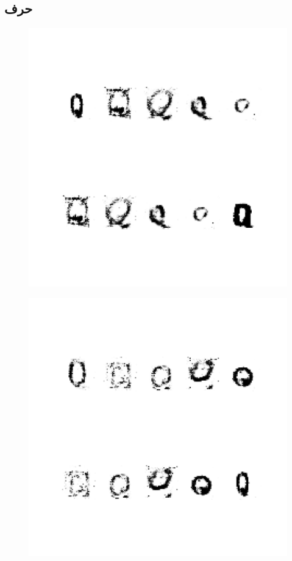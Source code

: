 \documentclass{article}
\begin{document}
\subsection{حرف }
\begin{figure}[H]
	\centerline{\includegraphics[width=\textwidth , height=\textheight ]{../results/CGAN_Adam/figs/letters/Q/95.pdf}}
\end{figure}
\begin{figure}[H]
	\centerline{\includegraphics[width=\textwidth , height=\textheight ]{../results/CGAN_Adam/figs/letters/Q/90.pdf}}
\end{figure}
\end{document}
